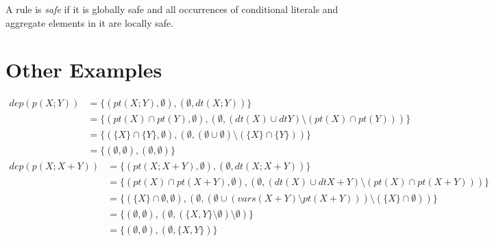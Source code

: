\documentclass{article}
\newcommand{\set}[1]{\{#1\}}
\newcommand\Vars{\mathit{vars}}
\newcommand\Provide{\mathit{pt}}
\newcommand\Depend{\mathit{dt}}
\begin{document}
	A rule is \emph{safe} if it is globally safe and all occurrences of conditional literals and aggregate elements in it are locally safe.

	\section{Other Examples}
	\begin{align*}
		dep(p(X;Y)) &= \set{(\Provide(X;Y), \emptyset), (\emptyset, \Depend(X;Y))} \\
		&= \set{(\Provide(X) \cap \Provide(Y), \emptyset), (\emptyset, (\Depend(X) \cup \Depend{Y}) \setminus (\Provide(X) \cap \Provide(Y)))} \\
		&= \set{(\set{X} \cap \set{Y}, \emptyset), (\emptyset, (\emptyset \cup \emptyset) \setminus (\set{X} \cap \set{Y}))} \\
		&= \set{(\emptyset, \emptyset), (\emptyset, \emptyset)}
	\end{align*}
	\begin{align*}
		dep(p(X;X+Y)) &= \set{(\Provide(X;X+Y), \emptyset), (\emptyset, \Depend(X;X+Y))} \\
		&= \set{(\Provide(X) \cap \Provide(X+Y), \emptyset), (\emptyset, (\Depend(X) \cup \Depend{X+Y}) \setminus (\Provide(X) \cap \Provide(X+Y)))} \\
		&= \set{(\set{X} \cap \emptyset, \emptyset), (\emptyset, (\emptyset \cup (\Vars(X+Y) \setminus \Provide(X+Y))) \setminus (\set{X} \cap \emptyset))} \\
		&= \set{(\emptyset, \emptyset), (\emptyset, (\set{X,Y} \setminus \emptyset) \setminus \emptyset)} \\
		&= \set{(\emptyset, \emptyset), (\emptyset, \set{X,Y})}
	\end{align*}
\end{document}
